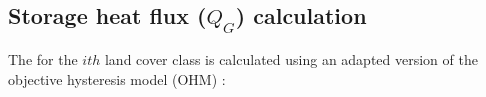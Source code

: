 \documentclass[final,3p,times,authoryear]{elsarticle}
\begin{document}
\subsection{Storage heat flux ($Q_{G}$) calculation}\label{sec:lumps}



The  for the $ith$ land cover class is calculated using an adapted version of the objective hysteresis model (OHM) \citep{Grimmond2002a}: 





\end{document}
